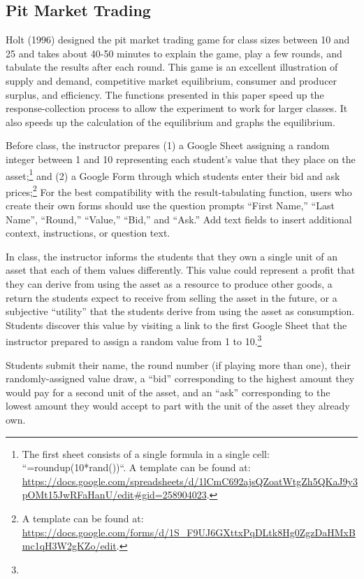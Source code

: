 \documentclass[
]{article}
\begin{document}
\hypertarget{pit-market-trading}{%
\subsection{Pit Market Trading}\label{pit-market-trading}}

Holt (1996) designed the pit market trading game for class sizes between
10 and 25 and takes about 40-50 minutes to explain the game, play a few
rounds, and tabulate the results after each round. This game is an
excellent illustration of supply and demand, competitive market
equilibrium, consumer and producer surplus, and efficiency. The
functions presented in this paper speed up the response-collection
process to allow the experiment to work for larger classes. It also
speeds up the calculation of the equilibrium and graphs the equilibrium.

Before class, the instructor prepares (1) a Google Sheet assigning a
random integer between 1 and 10 representing each student's value that
they place on the asset;\footnote{The first sheet consists of a single
  formula in a single cell: ``=roundup(10*rand())``. A template can be
  found at:
  \url{https://docs.google.com/spreadsheets/d/1lCmC692ajsQZoatWtgZh5QKaJ9y3pOMt15JwRFaHanU/edit\#gid=258904023}.}
and (2) a Google Form through which students enter their bid and ask
prices;\footnote{A template can be found at:
  \url{https://docs.google.com/forms/d/1S_F9UJ6GXttxPqDLtk8Hg0ZgzDaHMxBmc1qH3W2gKZo/edit}.}
For the best compatibility with the result-tabulating function, users
who create their own forms should use the question prompts ``First
Name,'' ``Last Name'', ``Round,'' ``Value,'' ``Bid,'' and ``Ask.'' Add
text fields to insert additional context, instructions, or question
text.

In class, the instructor informs the students that they own a single
unit of an asset that each of them values differently. This value could
represent a profit that they can derive from using the asset as a
resource to produce other goods, a return the students expect to receive
from selling the asset in the future, or a subjective ``utility'' that
the students derive from using the asset as consumption. Students
discover this value by visiting a link to the first Google Sheet that
the instructor prepared to assign a random value from 1 to
10.\footnote{}

Students submit their name, the round number (if playing more than one),
their randomly-assigned value draw, a ``bid'' corresponding to the
highest amount they would pay for a second unit of the asset, and an
``ask'' corresponding to the lowest amount they would accept to part
with the unit of the asset they already own.
\end{document}
